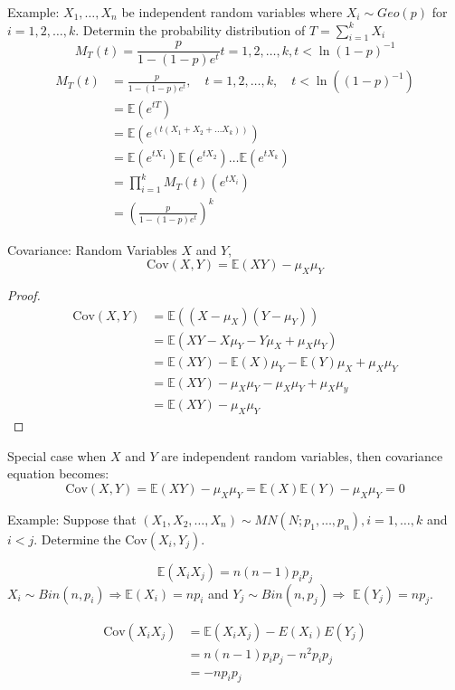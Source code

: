 \documentclass{article}
\newcommand{\E}{\mathbb{E}}
\newcommand{\Cov}{\mathrm{Cov}}
\begin{document}
\newpage
\noindent Example: $X_1, \dotsc, X_n$ be independent random variables where $X_i \sim Geo(p)$ for $i = 1, 2, \dotsc, k$. Determin the probability distribution of $T = \sum_{i = 1}^{k}X_i$
$$M_T(t) = \frac{p}{1- (1 - p)e^t}t = 1, 2, \dotsc, k, t < \ln(1-p)^{-1}$$
\begin{align*}
    M_T(t) &= \frac{p}{1 - (1-p)e^t}, \quad t=1, 2, \dots, k, \quad t < \ln((1-p)^{-1}) \\
     &= \E(e^{tT})\\
     &= \E(e^{(t(X_1+X_2+ \dotsc X_k))})\\
     &= \E(e^{tX_1})\E(e^{tX_2}) \dotsc \E(e^{tX_k})\\
     &= \prod_{i=1}^{k}M_T(t)(e^{tX_i})\\
     &= (\frac{p}{1-(1-p)e^t})^k
\end{align*}

\noindent Covariance: Random Variables $X$ and $Y$,
$$\Cov(X,Y) = \E(XY) - \mu_X\mu_Y$$
\begin{proof}
    \begin{align*}
        \Cov(X, Y) &= \E((X - \mu_X)(Y - \mu_Y))\\
        &= \E(XY - X\mu_Y - Y\mu_X + \mu_X\mu_Y)\\
        &= \E(XY) - \E(X)\mu_Y - \E(Y)\mu_X + \mu_X\mu_Y\\
        &= \E(XY) - \mu_X\mu_Y - \mu_X\mu_Y + \mu_X\mu_y\\
        &= \E(XY) - \mu_X\mu_Y
    \end{align*}
\end{proof}
\noindent Special case when $X$ and $Y$ are independent random variables, then covariance equation becomes:
$$\Cov(X,Y) = \E(XY) - \mu_X\mu_Y = \E(X)\E(Y) - \mu_X\mu_Y = 0$$


\noindent Example: Suppose that $(X_1, X_2, \dotsc, X_n) \sim MN(N; p_1, \dotsc, p_n), i = 1, \dotsc, k$ and $i < j$.
Determine the $\Cov(X_i, Y_j)$.

$$\E(X_iX_j) = n(n-1)p_ip_j$$
$X_i \sim Bin(n,p_i) \Rightarrow \E(X_i) = np_i$ and $Y_j \sim Bin(n, p_j) \Rightarrow$ $\E(Y_j) = np_j$. 

\begin{align*}
\Cov(X_iX_j) &= \E(X_iX_j) - E(X_i)E(Y_j)\\
&= n(n-1)p_ip_j - n^2p_ip_j\\
&= -np_ip_j
\end{align*}
\end{document}
